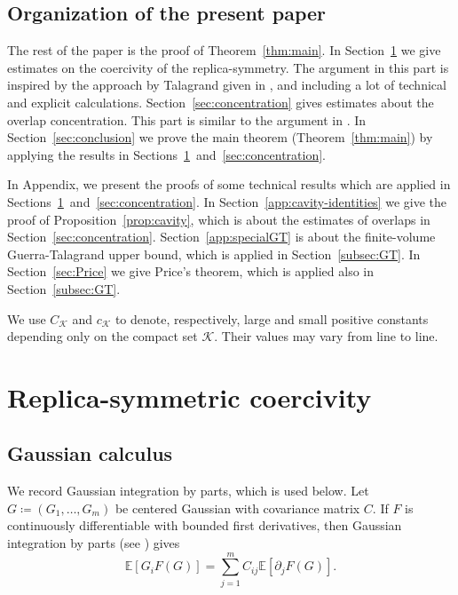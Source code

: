 \documentclass[11pt]{article}
\numberwithin{equation}{section}
\newcommand{\E}{\mathbb{E}}
\newcommand{\1}{\mathbf 1}
\begin{document}
\subsection{Organization of the present paper}

The rest of the paper is the proof of Theorem~\ref{thm:main}.
In Section~\ref{sec:coercivity} we give estimates on the coercivity of the replica-symmetry.
The argument in this part is inspired by the approach by Talagrand given in \cite{TalagrandParisi}, and including a lot of technical and explicit calculations.
Section~\ref{sec:concentration} gives estimates about the overlap concentration. This part is similar to the argument in \cite{KusuokaNakajima1}.
In Section~\ref{sec:conclusion} we prove the main theorem (Theorem~\ref{thm:main}) by applying the results in Sections~\ref{sec:coercivity}~and~\ref{sec:concentration}.

In Appendix, we present the proofs of some technical results which are applied in Sections~\ref{sec:coercivity}~and~\ref{sec:concentration}.
In Section~\ref{app:cavity-identities} we give the proof of Proposition~\ref{prop:cavity}, which is about the estimates of overlaps in Section~\ref{sec:concentration}.
Section~\ref{app:specialGT} is about the finite-volume Guerra-Talagrand upper bound, which is applied in Section~\ref{subsec:GT}.
In Section~\ref{sec:Price} we give Price's theorem, which is applied also in Section~\ref{subsec:GT}.

We use \(C_{\mathcal K}\) and \(c_{\mathcal K}\) to denote, respectively, large and small positive constants depending only on the compact set \(\mathcal K\). Their values may vary from line to line.
\section{Replica-symmetric coercivity}\label{sec:coercivity}

\subsection{Gaussian calculus}\label{subsec:gaussian}

We record Gaussian integration by parts, which is used below.  Let
$G\coloneqq(G_1,\ldots,G_m)$ be centered Gaussian with covariance
matrix $C$.
If $F$ is continuously differentiable with bounded first derivatives,
then Gaussian integration by parts (see \cite[Vol. 1, Sec. A.4]{Talagrand}) gives
\begin{equation}
 \E[G_iF(G)]=\sum_{j=1}^m C_{ij}\E[\partial_jF(G)].
 \label{eq:GIBP}
\end{equation}
\end{document}
